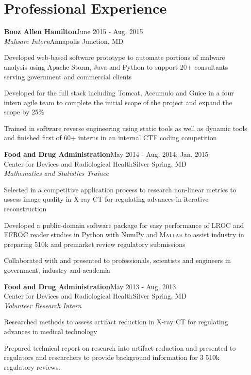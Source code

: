 \documentclass[letterpaper,12pt]{article}
\def \myrespresectionskip {-.25in}
\def \resumeitemizeskip{0in}
\def \jobskip{.075in}
\newcommand{\resheading}[5]{
\normalsize{\textbf{#1}}\hfill{\rmfamily\normalsize\textcolor{faded}{#2}} \\
\normalsize{#3}\hfill{\textcolor{faded}{\normalsize#4}}\\
\normalsize{#5}
\normalsize
}
\begin{document}
\section*{Professional Experience}
\resheading{{Booz Allen Hamilton}}{June 2015 \-- Aug. 2015}{\emph{Malware Intern}}{Annapolis Junction, MD}{}
{ \footnotesize
\vspace{-.2in}
      \begin{resumeitemize}
	\item{Developed web-based software prototype to automate portions of malware analysis using Apache Storm, Java and Python to support 20+ consultants serving government and commercial clients}
	\item{Developed for the full stack including Tomcat, Accumulo and Guice in a four intern agile team to complete the initial scope of the project and expand the scope by 25\%}
	\item{Trained in software reverse engineering using static tools as well as dynamic tools and finished first of 60+ interns in an internal CTF coding competition}
          \end{resumeitemize}
}
\vspace{\jobskip}
\resheading{{Food and Drug Administration}}{May 2014 \-- Aug. 2014; Jan. 2015}{{Center for Devices and Radiological Health}}{Silver Spring, MD}{\emph{Mathematics and Statistics Trainee}} 
   { \footnotesize
\vspace{\resumeitemizeskip}
      \begin{resumeitemize}
	 \item{Selected in a competitive application process to research non-linear metrics to assess image quality in {X-ray CT} for regulating advances in iterative reconstruction}
            \item{Developed a public-domain software package for easy performance of LROC and EFROC reader studies in Python with NumPy and \textsc{Matlab} to assist industry in preparing 510k and premarket review regulatory submissions}
	 \item{Collaborated with and presented to professionals, scientists and engineers in government, industry and academia}
          \end{resumeitemize}
   }
\vspace{\jobskip}
\resheading{{Food and Drug Administration}}{May 2013 \-- Aug. 2013}{{Center for Devices and Radiological Health}}{Silver Spring, MD}{\emph{Volunteer Research Intern}}
   { \footnotesize
\vspace{\resumeitemizeskip}
      \begin{resumeitemize}
	 \item{Researched methods to assess artifact reduction in {X-ray CT} for regulating advances in medical technology}
	\item{Prepared technical report on research into artifact reduction and presented to regulators and researchers to provide background information for 3 510k regulatory reviews.} 
          \end{resumeitemize}
   }
\vspace{\myrespresectionskip}
\end{document}
